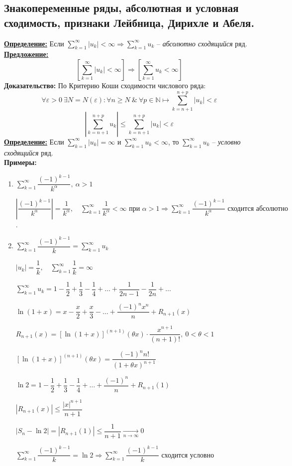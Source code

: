 \documentclass[a4paper,12pt]{article} %
\newcommand{\N}{\mathbb{N}}
\newcommand{\series}{\sum\limits_{k=1}^{\infty}}
\newcommand{\useries}{\sum\limits_{k=1}^{\infty} u_k}
\newcommand{\useriesl}{\sum\limits_{k=1}^{\infty} u_k < \infty}
\newcommand{\auseriesl}{\sum\limits_{k=1}^{\infty} |u_k| < \infty}
\newcommand{\auseriese}{\sum\limits_{k=1}^{\infty} |u_k| = \infty}
\begin{document}
\subsection{Знакопеременные ряды, абсолютная и условная сходимость, признаки Лейбница, Дирихле и Абеля.}
\underline{\textbf{Определение:}}
Если $\auseriesl \Rightarrow \useries$ -- \textit{абсолютно сходящийся} ряд.\\
\underline{\textbf{Предложение:}}
\[ \left[ \auseriesl \right] \Rightarrow \left[ \useriesl \right] \]
\textbf{Доказательство:}
По Критерию Коши сходимости числового ряда:
\[\forall \varepsilon > 0 \ \exists N = N(\varepsilon): \forall n \geqslant N \ \& \ \forall p \in \N \mapsto \sum\limits_{k=n+1}^{n+p} |u_k| < \varepsilon \]
\[\left| \sum\limits_{k=n+1}^{n+p} u_k \right| \leqslant \sum\limits_{k=n+1}^{n+p} |u_k| < \varepsilon\]
\underline{\textbf{Определение:}}
Если $\auseriese$ и $\useriesl$, то $\useries$ -- \textit{условно сходящийся} ряд.\\
\textbf{Примеры:}
\begin{enumerate}
	\item $\series \dfrac{(-1)^{k-1}}{k^{\alpha}}, \ \alpha > 1$
	
	$\left| \dfrac{(-1)^{k-1}}{k^{\alpha}} \right| = \dfrac{1}{k^{\alpha}}, \hspace{1em} \series \dfrac{1}{k^{\alpha}} < \infty \text{ при } \alpha > 1 \Rightarrow \series \dfrac{(-1)^{k-1}}{k^{\alpha}} \text{ сходится абсолютно}$.
	\item $\series \dfrac{(-1)^{k-1}}{k} = \useries$
	
	$|u_k| = \dfrac{1}{k}, \hspace{1em} \series \dfrac{1}{k} = \infty$
	
	$\useries = 1 - \dfrac{1}{2} + \dfrac{1}{3} - \dfrac{1}{4} + \ldots + \dfrac{1}{2n-1} - \dfrac{1}{2n} + \ldots$
	
	$\ln(1+x) = x - {\dfrac{x}{2}} + \dfrac{x}{3} - \ldots + \dfrac{(-1)^n x^n}{n} + R_{n+1}(x)$
	
	$R_{n+1}(x) = \left[ \ln(1+x) \right]^{(n+1)}(\theta x) \cdot \dfrac{x^{n+1}}{(n+1)!}, \ 0<\theta<1$
	
	$\left[ \ln(1+x) \right]^{(n+1)}(\theta x) = \dfrac{(-1)^n n!}{(1+\theta x)^{n+1}}$
	
	$\ln2 = 1 - \dfrac{1}{2} + \dfrac{1}{3} - \dfrac{1}{4} + \ldots + \dfrac{(-1)^n}{n} + R_{n+1}(1)$
	
	$\left| R_{n+1}(x) \right| \leqslant \dfrac{|x|^{n+1}}{n+1}$
	
	$\left| S_n - \ln2 \right| = \left| R_{n+1}(1) \right| \leqslant \dfrac{1}{n+1} \xrightarrow[n \to \infty]{} 0$
	
	$\series \dfrac{(-1)^{k-1}}{k} = \ln2 \Rightarrow \series \dfrac{(-1)^{k-1}}{k} \text{ сходится условно}$
\end{enumerate}
\end{document}

